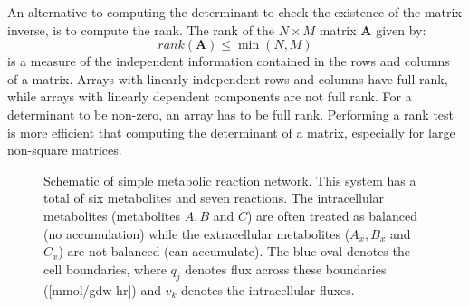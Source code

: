 \documentclass[11pt]{article}
\theoremstyle{definition}
\begin{document}
An alternative to computing the determinant to check the existence of the matrix inverse, is to compute the rank.
The rank of the $N\times{M}$ matrix $\mathbf{A}$ given by:
\begin{equation}
	rank\left(\mathbf{A}\right)\leq\min\left(N,M\right)
\end{equation}is a measure of the independent information contained in the rows and columns of a matrix.
Arrays with linearly independent rows and columns have full rank, while arrays with linearly dependent components are not full rank.
For a determinant to be non-zero, an array has to be full rank. Performing a rank test is more efficient that computing the determinant of a matrix, especially for large non-square matrices.


\begin{figure*}[h!]\centering
{}
\caption{Schematic of simple metabolic reaction network. This system has a total of six metabolites and seven reactions.
The intracellular metabolites (metabolites $A,B$ and $C$) are often treated as balanced (no accumulation) while the extracellular metabolites ($A_{x},B_{x}$ and $C_{x}$) are not balanced (can accumulate).
The blue-oval denotes the cell boundaries, where $q_{j}$ denotes flux across these boundaries ([mmol/gdw-hr]) and $v_{k}$ denotes the intracellular fluxes.}\label{fig-system}
\end{figure*}
\end{document}

